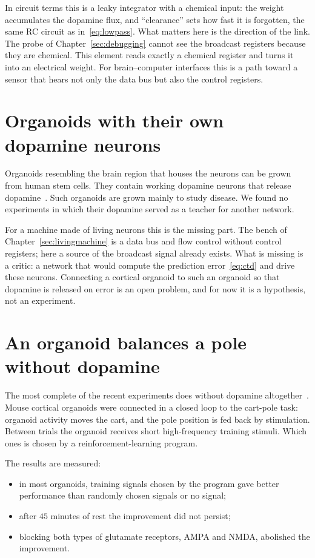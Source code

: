 In circuit terms this is a leaky integrator with a chemical input: the weight accumulates the dopamine flux, and ``clearance'' sets how fast it is forgotten, the same RC circuit as in~\eqref{eq:lowpass}. What matters here is the direction of the link. The probe of Chapter~\ref{sec:debugging} cannot see the broadcast registers because they are chemical. This element reads exactly a chemical register and turns it into an electrical weight. For brain--computer interfaces this is a path toward a sensor that hears not only the data bus but also the control registers.

\section{Organoids with their own dopamine neurons}
\label{sec:midbrainorg}

Organoids resembling the brain region that houses the  neurons can be grown from human stem cells. They contain working dopamine neurons that release dopamine~\cite{Jo2016}. Such organoids are grown mainly to study disease. We found no experiments in which their dopamine served as a teacher for another network.

For a machine made of living neurons this is the missing part. The bench of Chapter~\ref{sec:livingmachine} is a data bus and flow control without control registers; here a source of the broadcast signal already exists. What is missing is a critic: a network that would compute the prediction error~\eqref{eq:ctd} and drive these neurons. Connecting a cortical organoid to such an organoid so that dopamine is released on error is an open problem, and for now it is a hypothesis, not an experiment.

\section{An organoid balances a pole without dopamine}
\label{sec:cartpole}

The most complete of the recent experiments does without dopamine altogether~\cite{Robbins2026}. Mouse cortical organoids were connected in a closed loop to the cart-pole task: organoid activity moves the cart, and the pole position is fed back by stimulation. Between trials the organoid receives short high-frequency training stimuli. Which ones is chosen by a reinforcement-learning program.

The results are measured:
\begin{itemize}
\item in most organoids, training signals chosen by the program gave better performance than randomly chosen signals or no signal;
\item after $45$ minutes of rest the improvement did not persist;
\item blocking both types of glutamate receptors, AMPA and NMDA, abolished the improvement.
\end{itemize}


